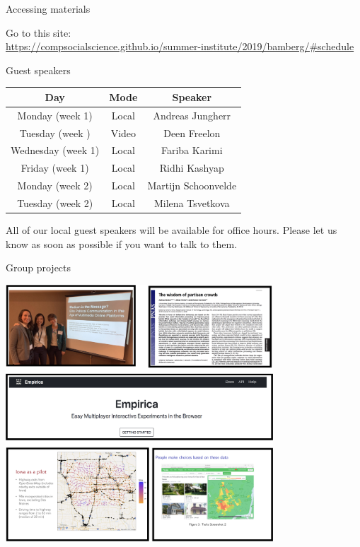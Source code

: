 \documentclass{beamer}
\begin{document}
\begin{frame}{Accessing materials}

Go to this site: \\
\url{https://compsocialscience.github.io/summer-institute/2019/bamberg/\#schedule}

\end{frame}


\begin{frame}{Guest speakers}



\begin{center}
\begin{tabular}{ c|c|c } 
\hline
\textbf{Day} & \textbf{Mode} & \textbf{Speaker} \\
\hline
Monday (week 1) & Local & Andreas Jungherr\\ 
Tuesday (week ) & Video & Deen Freelon \\ 
Wednesday (week 1) & Local & Fariba Karimi \\ 
Friday  (week 1)& Local & Ridhi Kashyap\\ 
Monday  (week 2)& Local & Martijn Schoonvelde\\ 
Tuesday (week 2)& Local & Milena Tsvetkova \\ 

\hline
\end{tabular}
\end{center}

All of our local guest speakers will be available for office hours. Please let us know as soon as possible if you want to talk to them.

\end{frame}


\begin{frame}{Group projects}

\begin{center}
\includegraphics[width=0.75\textwidth]{figures/2019_group_projects.png}
\end{center}

\end{frame}
\end{document}

